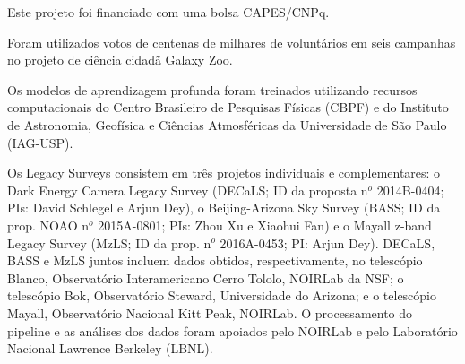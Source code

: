 \documentclass[
	12pt,				%
	openright,			%
	twoside,			%
	a4paper,			%
  sumario=tradicional,
	english,			%
	french,				%
	spanish,			%
	brazil				%
	]{abntex2}
\begin{document}
\begin{agradecimentos}
  Este projeto foi financiado com uma bolsa CAPES/CNPq.

  Foram utilizados votos de centenas de milhares de voluntários em seis campanhas no projeto de ciência cidadã Galaxy Zoo.


  Os modelos de aprendizagem profunda foram treinados utilizando recursos computacionais do Centro Brasileiro de Pesquisas Físicas (CBPF) e do Instituto de Astronomia, Geofísica e Ciências Atmosféricas da Universidade de São Paulo (IAG-USP).

  Os Legacy Surveys consistem em três projetos individuais e complementares: o Dark Energy Camera Legacy Survey (DECaLS; ID da proposta n$^o$ 2014B-0404; PIs: David Schlegel e Arjun Dey), o Beijing-Arizona Sky Survey (BASS; ID da prop. NOAO n$^o$ 2015A-0801; PIs: Zhou Xu e Xiaohui Fan) e o Mayall z-band Legacy Survey (MzLS; ID da prop. n$^o$ 2016A-0453; PI: Arjun Dey). DECaLS, BASS e MzLS juntos incluem dados obtidos, respectivamente, no telescópio Blanco, Observatório Interamericano Cerro Tololo, NOIRLab da NSF; o telescópio Bok, Observatório Steward, Universidade do Arizona; e o telescópio Mayall, Observatório Nacional Kitt Peak, NOIRLab. O processamento do pipeline e as análises dos dados foram apoiados pelo NOIRLab e pelo Laboratório Nacional Lawrence Berkeley (LBNL).
\end{agradecimentos}


\end{document}
